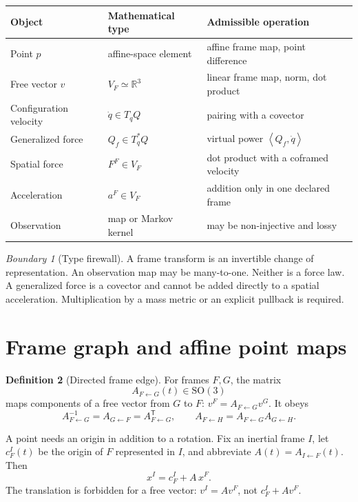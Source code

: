 \documentclass[11pt,a4paper]{article}
\theoremstyle{definition}
\newtheorem{definition}{Definition}[section]
\theoremstyle{plain}
\theoremstyle{remark}
\newtheorem{warning}[definition]{Boundary}
\newcommand{\R}{\mathbb{R}}
\newcommand{\pair}[2]{\left\langle #1,#2\right\rangle}
\newcommand{\SO}{\mathrm{SO}}
\begin{document}
\begin{center}
\begin{tabularx}{\linewidth}{L{31mm}L{35mm}Y}
\toprule
Object & Mathematical type & Admissible operation \\
\midrule
Point \(p\) & affine-space element & affine frame map, point difference \\
Free vector \(v\) & \(V_F\simeq\R^3\) & linear frame map, norm, dot product \\
Configuration velocity & \(\dot q\in T_qQ\) & pairing with a covector \\
Generalized force & \(Q_f\in T_q^*Q\) & virtual power \(\pair{Q_f}{\dot q}\) \\
Spatial force & \(F^F\in V_F\) & dot product with a coframed velocity \\
Acceleration & \(a^F\in V_F\) & addition only in one declared frame \\
Observation & map or Markov kernel & may be non-injective and lossy \\
\bottomrule
\end{tabularx}
\end{center}

\begin{warning}[Type firewall]
A frame transform is an invertible change of representation. An
observation map may be many-to-one. Neither is a force law. A
generalized force is a covector and cannot be added directly to a
spatial acceleration. Multiplication by a mass metric or an explicit
pullback is required.
\end{warning}

\section{Frame graph and affine point maps}

\begin{definition}[Directed frame edge]
For frames \(F,G\), the matrix
\[
A_{F\leftarrow G}(t)\in\SO(3)
\]
maps components of a free vector from \(G\) to \(F\):
\(v^F=A_{F\leftarrow G}v^G\). It obeys
\[
A_{F\leftarrow G}^{-1}=A_{G\leftarrow F}
=A_{F\leftarrow G}^{\mathsf T},\qquad
A_{F\leftarrow H}=A_{F\leftarrow G}A_{G\leftarrow H}.
\]
\end{definition}

A point needs an origin in addition to a rotation. Fix an inertial
frame \(I\), let \(c^I_F(t)\) be the origin of \(F\) represented in
\(I\), and abbreviate \(A(t)=A_{I\leftarrow F}(t)\). Then
\begin{equation}\label{eq:affine-point}
x^I=c^I_F+A\,x^F.
\end{equation}
The translation is forbidden for a free vector:
\(v^I=A v^F\), not \(c^I_F+A v^F\).
\end{document}
